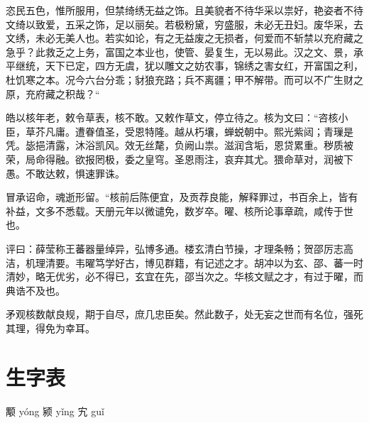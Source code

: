 \documentclass[12pt,UTF8]{ctexbook}
\begin{document}
恣民五色，惟所服用，但禁绮绣无益之饰。且美貌者不待华采以祟好，艳姿者不待文绮以致爱，五采之饰，足以丽矣。若极粉黛，穷盛服，未必无丑妇。废华采，去文绣，未必无美人也。若实如论，有之无益废之无损者，何爱而不斩禁以充府藏之急乎？此救乏之上务，富国之本业也，使管、晏复生，无以易此。汉之文、景，承平继统，天下已定，四方无虞，犹以雕文之妨农事，锦绣之害女红，开富国之利，杜饥寒之本。况今六台分乖；豺狼充路；兵不离疆；甲不解带。而可以不广生财之原，充府藏之积哉？“

皓以核年老，敕令草表，核不敢。又敕作草文，停立待之。核为文曰：“咨核小臣，草芥凡庸。遭眷值圣，受恩特隆。越从朽壤，蝉蜕朝中。熙光紫闼；青璅是凭。毖挹清露，沐浴凯风。效无丝氂，负阙山祟。滋润含垢，恩贷累重。秽质被荣，局命得融。欲报罔极，委之皇穹。圣恩雨注，哀弃其尤。猥命草对，润被下愚。不敢达敕，惧速罪诛。

冒承诏命，魂逝形留。“核前后陈便宜，及贡荐良能，解释罪过，书百余上，皆有补益，文多不悉载。天册元年以微谴免，数岁卒。曜、核所论事章疏，咸传于世也。

评曰：薛莹称王蕃器量绰异，弘博多通。楼玄清白节操，才理条畅；贺邵厉志高洁，机理清要。韦曜笃学好古，博见群籍，有记述之才。胡冲以为玄、邵、蕃一时清妙，略无优劣，必不得已，玄宜在先，邵当次之。华核文赋之才，有过于曜，而典诰不及也。

矛观核数献良规，期于自尽，庶几忠臣矣。然此数子，处无妄之世而有名位，强死其理，得免为幸耳。

\backmatter
\chapter{生字表}

颙 y\'ong  颍 yǐng  宄 gu\v{i}
\end{document}
